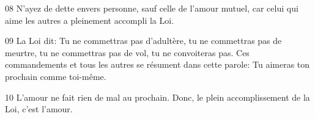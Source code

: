 
08 N’ayez de dette envers personne, sauf celle de l’amour mutuel, car celui qui aime les autres a pleinement accompli la Loi.

09 La Loi dit: Tu ne commettras pas d’adultère, tu ne commettras pas de meurtre, tu ne commettras pas de vol, tu ne convoiteras pas. Ces commandements et tous les autres se résument dans cette parole: Tu aimeras ton prochain comme toi-même.

10 L’amour ne fait rien de mal au prochain. Donc, le plein accomplissement de la Loi, c’est l’amour.